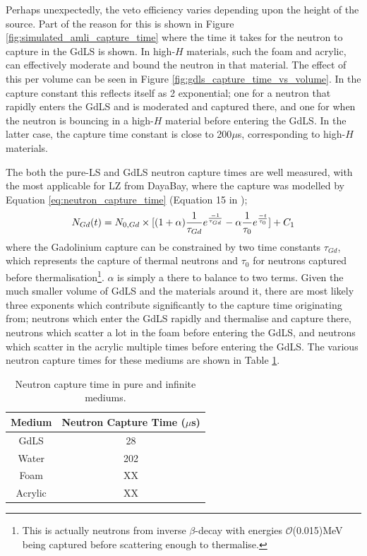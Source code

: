 \par
Perhaps unexpectedly, the veto efficiency varies depending upon the height of the source.
Part of the reason for this is shown in Figure \ref{fig:simulated_amli_capture_time} where the time it takes for the neutron to capture in the GdLS is shown.
In high-$H$ materials, such the foam and acrylic, can effectively moderate and bound the neutron in that material.
The effect of this per volume can be seen in Figure \ref{fig:gdls_capture_time_vs_volume}.
In the capture constant this reflects itself as 2 exponential; one for a neutron that rapidly enters the GdLS and is moderated and captured there, and one for when the neutron is bouncing in a high-$H$ material before entering the GdLS.
In the latter case, the capture time constant is close to 200$\mu$s, corresponding to high-$H$ materials.
\par
The both the pure-LS and GdLS neutron capture times are well measured, with the most applicable for LZ from DayaBay, where the capture was modelled by Equation \ref{eq:neutron_capture_time} (Equation 15 in \cite{Dayabay_neutron_capture_fit_ref});
\begin{equation}
    N_{Gd}(t) = N_{0,Gd} \times [(1+\alpha)\frac{1}{\tau_{Gd}}e^{\frac{-1}{\tau_{Gd}}} - \alpha\frac{1}{\tau_{0}}e^{\frac{-t}{\tau_{0}}}] + C_{1} \\
\label{eq:neutron_capture_time}
\end{equation}
where the Gadolinium capture can be constrained by two time constants $\tau_{Gd}$, which represents the capture of thermal neutrons and $\tau_{0}$ for neutrons captured before thermalisation\footnote{This is actually neutrons from inverse $\beta$-decay with energies $\mathcal{O}$(0.015)MeV being captured before scattering enough to thermalise.}. 
$\alpha$ is simply a there to balance to two terms.
Given the much smaller volume of GdLS and the materials around it, there are most likely three exponents which contribute significantly to the capture time originating from; neutrons which enter the GdLS rapidly and thermalise and capture there, neutrons which scatter a lot in the foam before entering the GdLS, and neutrons which scatter in the acrylic multiple times before entering the GdLS.
The various neutron capture times for these mediums are shown in Table \ref{tab:medium_neutron_capture_time}.

\begin{table}
\centering
\begin{tabular}{c|c}
    Medium  & Neutron Capture Time ($\mu$s)  \\ \hline
    GdLS    & 28 \cite{ucsb_gdls_dicebox_simulations_ref}  \\
    Water   & 202 \cite{snoplus_neutron_capture_time_on_water_ref}  \\
    Foam    & XX   \\
    Acrylic & XX  
\end{tabular}
\label{tab:medium_neutron_capture_time}
\caption{Neutron capture time in pure and infinite mediums.}
\end{table}


